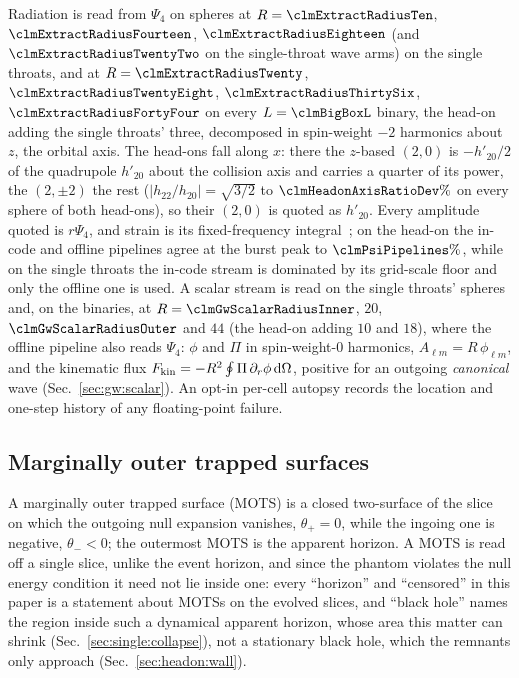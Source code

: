\documentclass[twocolumn,floatfix,aps,prd,superscriptaddress,nofootinbib]{revtex4-2}
\begin{document}
Radiation is read from $\Psi_4$ on spheres at $R=\clmExtractRadiusTen$, $\clmExtractRadiusFourteen$, $\clmExtractRadiusEighteen$ (and $\clmExtractRadiusTwentyTwo$ on the single-throat wave arms) on the single throats, and at $R=\clmExtractRadiusTwenty$, $\clmExtractRadiusTwentyEight$, $\clmExtractRadiusThirtySix$, $\clmExtractRadiusFortyFour$ on every $L=\clmBigBoxL$ binary, the head-on adding the single throats' three, decomposed in spin-weight $-2$ harmonics about $z$, the orbital axis. The head-ons fall along $x$: there the $z$-based $(2,0)$ is $-h'_{20}/2$ of the quadrupole $h'_{20}$ about the collision axis and carries a quarter of its power, the $(2,\pm2)$ the rest ($|h_{22}/h_{20}|=\sqrt{3/2}$ to $\clmHeadonAxisRatioDev\%$ on every sphere of both head-ons), so their $(2,0)$ is quoted as $h'_{20}$. Every amplitude quoted is $r\Psi_4$, and strain is its fixed-frequency integral~\cite{reisswig2011}; on the head-on the in-code and offline pipelines agree at the burst peak to $\clmPsiPipelines\%$, while on the single throats the in-code stream is dominated by its grid-scale floor and only the offline one is used. A scalar stream is read on the single throats' spheres and, on the binaries, at $R=\clmGwScalarRadiusInner$, $20$, $\clmGwScalarRadiusOuter$ and $44$ (the head-on adding $10$ and $18$), where the offline pipeline also reads $\Psi_4$: $\phi$ and $\Pi$ in spin-weight-$0$ harmonics, $A_{\ell m}=R\,\phi_{\ell m}$, and the kinematic flux $F_{\rm kin}=-R^2\oint\Pi\,\partial_r\phi\,\mathrm{d}\Omega$, positive for an outgoing \emph{canonical} wave (Sec.~\ref{sec:gw:scalar}). An opt-in per-cell autopsy records the location and one-step history of any floating-point failure.

\subsection{Marginally outer trapped surfaces}
\label{sec:setup:mots}

A marginally outer trapped surface (MOTS) is a closed two-surface of the slice on which the outgoing null
expansion vanishes, $\theta_+=0$, while the ingoing one is negative, $\theta_-<0$; the outermost MOTS is the
apparent horizon. A MOTS is read off a single slice, unlike the event horizon, and since the phantom violates
the null energy condition it need not lie inside one: every ``horizon'' and ``censored'' in this
paper is a statement about MOTSs on the evolved slices, and ``black hole'' names the region inside such a dynamical apparent horizon, whose area this matter can shrink (Sec.~\ref{sec:single:collapse}), not a stationary black hole, which the remnants only approach (Sec.~\ref{sec:headon:wall}).
\end{document}
